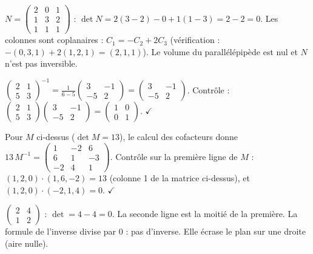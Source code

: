\begin{cas}
$N=\begin{pmatrix}2&0&1\\1&3&2\\1&1&1\end{pmatrix}$ : $\det N=2(3-2)-0+1(1-3)=2-2=0$. Les colonnes sont coplanaires : $C_1=-C_2+2C_3$ (vérification : $-(0,3,1)+2(1,2,1)=(2,1,1)$). Le volume du parallélépipède est nul et $N$ n'est pas inversible.
\end{cas}
\begin{exemple}
$\begin{pmatrix}2&1\\5&3\end{pmatrix}^{-1}=\frac1{6-5}\begin{pmatrix}3&-1\\-5&2\end{pmatrix}=\begin{pmatrix}3&-1\\-5&2\end{pmatrix}$. Contrôle : $\begin{pmatrix}2&1\\5&3\end{pmatrix}\begin{pmatrix}3&-1\\-5&2\end{pmatrix}=\begin{pmatrix}1&0\\0&1\end{pmatrix}$. $\checkmark$
\end{exemple}
\begin{exemple}
Pour $M$ ci-dessus ($\det M=13$), le calcul des cofacteurs donne $13\,M^{-1}=\begin{pmatrix}1&-2&6\\6&1&-3\\-2&4&1\end{pmatrix}$. Contrôle sur la première ligne de $M$ : $(1,2,0)\cdot(1,6,-2)=13$ (colonne 1 de la matrice ci-dessus), et $(1,2,0)\cdot(-2,1,4)=0$. $\checkmark$
\end{exemple}
\begin{cas}
$\begin{pmatrix}2&4\\1&2\end{pmatrix}$ : $\det=4-4=0$. La seconde ligne est la moitié de la première. La formule de l'inverse divise par $0$ : pas d'inverse. Elle écrase le plan sur une droite (aire nulle).
\end{cas}
